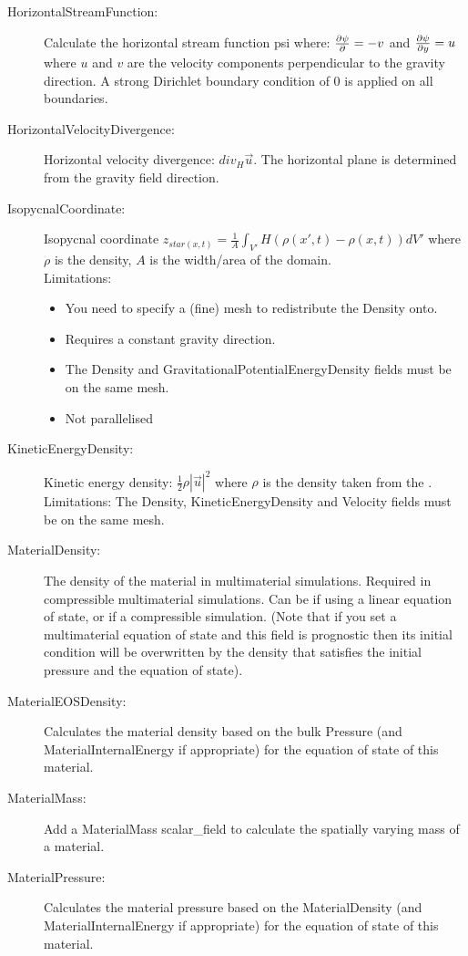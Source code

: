 \begin{description}
\item[HorizontalStreamFunction:]Calculate the horizontal stream function psi where:  $\ppx[]{\psi} = -v$ and  $\ppx[y]{\psi}  = u$ where $u$ and $v$ are the velocity components perpendicular to the gravity direction. A strong Dirichlet boundary condition of $0$ is applied on all boundaries.  
\item[HorizontalVelocityDivergence:]Horizontal velocity divergence: ${div}_H \vec{u}$. The horizontal plane is determined from the gravity field direction. 
\item[IsopycnalCoordinate:]Isopycnal coordinate
	$z_{star(x,t)} = \frac{1}{A} \int_{V'} H(\rho(x',t)-\rho(x,t)) dV'$ where $\rho$ is the density, $A$ is the width/area of the domain. \\
	Limitations:
	\begin{itemize}
	\item You need to specify a (fine) mesh to redistribute the Density onto.
	\item Requires a constant gravity direction. 
	\item The Density and GravitationalPotentialEnergyDensity fields must be on the same mesh. 
	\item Not parallelised
	\end{itemize} 
\item[KineticEnergyDensity:]Kinetic energy density: $\frac{1}{2} \rho |\vec{u}|^2$ where $\rho$ is the density taken from the . \\
	Limitations: The Density, KineticEnergyDensity and Velocity fields must be on the same mesh.  
\item[MaterialDensity:]The density of the material in multimaterial simulations. Required in compressible multimaterial simulations. Can be  if using a linear equation of state, or  if a compressible simulation. (Note that if you set a multimaterial equation of state and this field is prognostic then its initial condition will be overwritten by the density that satisfies the initial pressure and the equation of state).
\item[MaterialEOSDensity:]Calculates the material density based on the bulk Pressure (and MaterialInternalEnergy if appropriate) for the equation of state of this material.
\item[MaterialMass:]Add a MaterialMass scalar\_field to calculate the spatially varying mass of a material. 
\item[MaterialPressure:] Calculates the material pressure based on the MaterialDensity (and MaterialInternalEnergy if appropriate) for the equation of state of this material.

\end{description}
